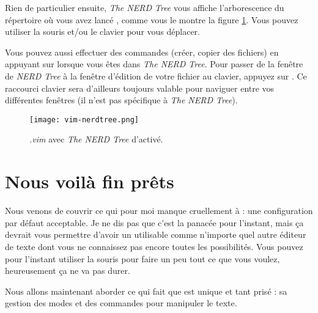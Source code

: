Rien de particulier ensuite, \emph{The NERD Tree} vous affiche l'arborescence du répertoire où vous avez lancé \vim, comme vous le montre la figure \ref{fig:vim-nerdtree}. Vous pouvez utiliser la souris et/ou le clavier pour vous déplacer. 

Vous pouvez aussi effectuer des commandes (créer, copier des fichiers) en appuyant sur \ttm lorsque vous êtes dans \emph{The NERD Tree}. Pour passer de la fenêtre de \emph{NERD Tree} à la fenêtre d'édition de votre fichier au clavier, appuyez sur . Ce raccourci clavier sera d'ailleurs toujours valable pour naviguer entre vos différentes fenêtres \vim (il n'est pas spécifique à \emph{The NERD Tree}).

\begin{figure}%
  \texttt{[image: vim-nerdtree.png]}
  \caption{\emph{.vim} avec \emph{The NERD Tree} d'activé.}
  \label{fig:vim-nerdtree}
\end{figure}

\section{Nous voilà fin prêts}

Nous venons de couvrir ce qui pour moi manque cruellement à \vim : une configuration par défaut acceptable. Je ne dis pas que c'est la panacée pour l'instant, mais ça devrait vous permettre d'avoir un \vim utilisable comme n'importe quel autre éditeur de texte dont vous ne connaissez pas encore toutes les possibilités. Vous pouvez pour l'instant utiliser la souris pour faire un peu tout ce que vous voulez, heureusement ça ne va pas durer.

Nous allons maintenant aborder ce qui fait que \vim est unique et tant prisé : sa gestion des modes et des commandes pour manipuler le texte.
